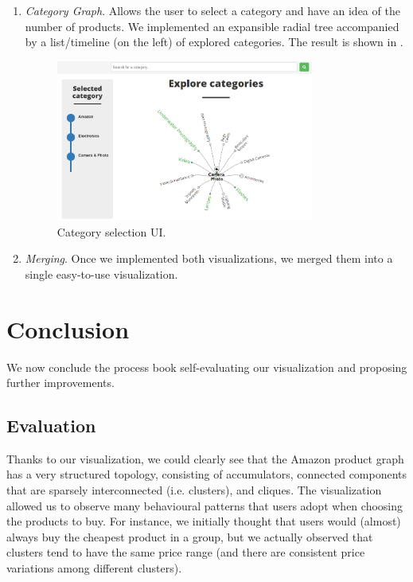 \documentclass[a4paper,12pt]{article}
\begin{document}
\begin{enumerate}
	\item \textit{Category Graph}. Allows the user to select a category and have an idea of the number of products. We implemented an expansible radial tree accompanied by a list/timeline (on the left) of explored categories. The result is shown in .
	
	\begin{figure}[H]
		\centering{}
		\includegraphics[width=0.8\textwidth]{img/category_graph.png}
		\caption{Category selection UI.}
		\label{fig:category_graph}
	\end{figure}

	\item \textit{Merging}. Once we implemented both visualizations, we merged them into a single easy-to-use visualization.
\end{enumerate}

\section{Conclusion}
We now conclude the process book self-evaluating our visualization and proposing further improvements.
\subsection{Evaluation}
Thanks to our visualization, we could clearly see that the Amazon product graph has a very structured topology, consisting of accumulators, connected components that are sparsely interconnected (i.e. clusters), and cliques. The visualization allowed us to observe many behavioural patterns that users adopt when choosing the products to buy. For instance, we initially thought that users would (almost) always buy the cheapest product in a group, but we actually observed that clusters tend to have the same price range (and there are consistent price variations among different clusters).
\end{document}
